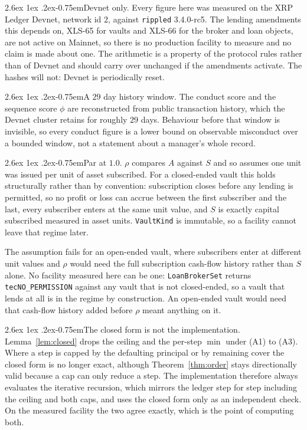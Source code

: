 \documentclass[11pt]{article}
\makeatletter
\renewcommand\paragraph{\@startsection{paragraph}{4}{\z@}%
  {2.6ex \@plus 1ex \@minus .2ex}{-0.75em}{\normalfont\normalsize\bfseries}}
\theoremstyle{orma}
\theoremstyle{ormaupright}
\makeatother
\begin{document}
\paragraph{Devnet only.} Every figure here was measured on the XRP Ledger Devnet, network id
$2$, against \texttt{rippled} 3.4.0-rc5. The lending amendments this depends on, XLS-65 for
vaults and XLS-66 for the broker and loan objects, are not active on Mainnet, so there is no
production facility to measure and no claim is made about one. The arithmetic is a property
of the protocol rules rather than of Devnet and should carry over unchanged if the
amendments activate. The hashes will not: Devnet is periodically reset.

\paragraph{A $29$ day history window.} The conduct score and the sequence score $\phi$ are
reconstructed from public transaction history, which the Devnet cluster retains for roughly
$29$ days. Behaviour before that window is invisible, so every conduct figure is a lower
bound on observable misconduct over a bounded window, not a statement about a manager's
whole record.

\paragraph{Par at $1.0$.} $\rho$ compares $A$ against $S$ and so assumes one unit was issued
per unit of asset subscribed. For a closed-ended vault this holds structurally rather than
by convention: subscription closes before any lending is permitted, so no profit or loss can
accrue between the first subscriber and the last, every subscriber enters at the same unit
value, and $S$ is exactly capital subscribed measured in asset units. \texttt{VaultKind} is
immutable, so a facility cannot leave that regime later.

The assumption fails for an
open-ended vault, where subscribers enter at different unit values and $\rho$ would need the
full subscription cash-flow history rather than $S$ alone. No facility measured here can be
one: \texttt{LoanBrokerSet} returns \texttt{tecNO\_PERMISSION} against any vault that is not
closed-ended, so a vault that lends at all is in the regime by construction. An open-ended
vault would need that cash-flow history added before $\rho$ meant anything on it.

\paragraph{The closed form is not the implementation.} Lemma~\ref{lem:closed} drops the
ceiling and the per-step $\min$ under (A1) to (A3). Where a step is capped by the defaulting
principal or by remaining cover the closed form is no longer exact, although
Theorem~\ref{thm:order} stays directionally valid because a cap can only reduce a step. The
implementation therefore always evaluates the iterative recursion, which mirrors the ledger
step for step including the ceiling and both caps, and uses the closed form only as an
independent check. On the measured facility the two agree exactly, which is the point of
computing both.
\end{document}
